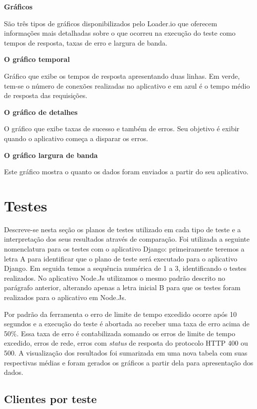   \textbf{Gráficos}

  São três tipos de gráficos disponibilizados pelo Loader.io que oferecem informações mais detalhadas
  sobre o que ocorreu na execução do teste como tempos de resposta, taxas de erro e largura de banda.

  \textbf{O gráfico temporal}

  Gráfico que exibe os tempos de resposta apresentando duas linhas. Em verde, tem-se o
  número de conexões realizadas no aplicativo e em azul é o tempo médio de resposta das requisições.

  \textbf{O gráfico de detalhes}

  O gráfico que exibe taxas de sucesso e também de erros. Seu objetivo é exibir quando o aplicativo
  começa a disparar os erros.

  \textbf{O gráfico largura de banda}

  Este gráfico mostra o quanto os dados foram enviados a partir do seu aplicativo.


\section{Testes}

  Descreve-se nesta seção os planos de testes utilizado em cada tipo de teste e a interpretação dos seus resultados
  através de comparação.
  Foi utilizada a seguinte nomenclatura para os testes com o aplicativo Django: primeiramente teremos a letra A para identificar
  que o plano de teste será executado para o aplicativo Django. Em seguida temos a sequência numérica de 1 a 3,
  identificando o testes realizados.
  No aplicativo Node.Js utilizamos o mesmo padrão descrito no parágrafo anterior, alterando apenas a letra inicial B para que os testes
  foram realizados para o aplicativo em Node.Js.

  Por padrão da ferramenta o erro de limite de tempo excedido ocorre após 10 segundos e a execução do teste é abortada
  ao receber uma taxa de erro acima de 50\%. Essa taxa de erro é contabilizada somando os erros de limite de tempo excedido, erros de
  rede, erros com \textit{status} de resposta do protocolo \ac{HTTP} 400 ou 500.
  A visualização dos resultados foi sumarizada em uma nova tabela com suas respectivas médias e foram gerados os gráficos a partir dela para apresentação dos
  dados.

\subsection{Clientes por teste}

